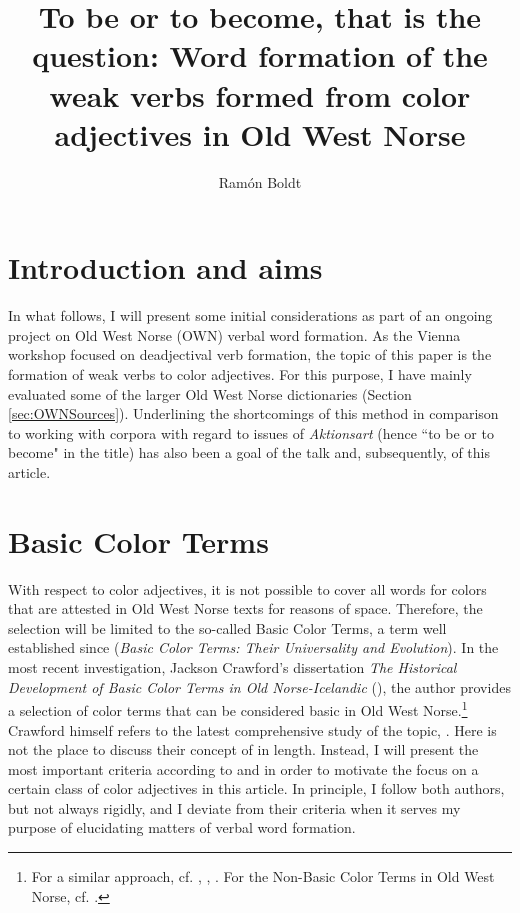 \documentclass[output=paper,colorlinks,citecolor=brown]{langscibook}
\title{To be or to become, that is the question: Word formation of the weak verbs formed from color adjectives in Old West Norse}
\author{Ramón Boldt\orcid{}\affiliation{Friedrich-Alexander-Universität
Erlangen-Nürnberg}}
\begin{document}
\maketitle


\section{Introduction and aims}
\label{sec:OWNintro}

In what follows, I will present some initial considerations as part of an ongoing project on Old West Norse (OWN) verbal word formation. As the Vienna workshop focused on deadjectival verb formation, the topic of this paper is the formation of weak verbs to color adjectives. For this purpose, I have mainly evaluated some of the larger Old West Norse dictionaries (Section \ref{sec:OWNSources}). Underlining the shortcomings of this method in comparison to working with corpora with regard to issues of \textit{Aktionsart} (hence ``to be or to become" in the title) has also been a goal of the talk and, subsequently, of this article.

\section{Basic Color Terms}
\label{sec:OWNBCT}

With respect to color adjectives, it is not possible to cover all words for colors that are attested in Old West Norse texts for reasons of space. Therefore, the selection will be limited to the so-called Basic Color Terms, a term well established since \citealt{Berlin1969} (\textit{Basic Color Terms: Their Universality and Evolution}). In the most recent investigation, Jackson Crawford’s dissertation \textit{The Historical Development of Basic Color Terms in Old Norse-Icelandic} (\citealt{Crawford2014}), the author provides a selection of color terms that can be considered basic in Old West Norse.\footnote{For a similar approach, cf. \citet{Wolf2013}, \citet{Bruckmann2012}, \citet{Wolf2006a}. For the Non-Basic Color Terms in Old West Norse, cf. \citet{Wolf2015}.} Crawford himself refers to the latest comprehensive study of the topic, \citet{Biggam2012}. Here is not the place to discuss their concept of  in length. Instead, I will present the most important criteria according to \citet[125--153]{Crawford2014} and \citet[21--42]{Biggam2012} in order to motivate the focus on a certain class of color adjectives in this article. In principle, I follow both authors, but not always rigidly, and I deviate from their criteria when it serves my purpose of elucidating matters of verbal word formation.
\end{document}
